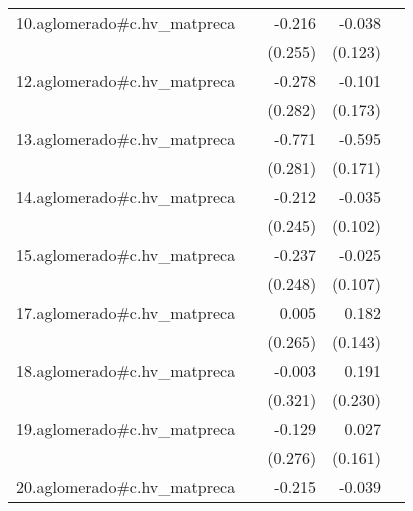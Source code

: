 {\begin{longtable}{l*{4}{D{.}{.}{-1}}}
\addlinespace
10.aglomerado#c.hv\_matpreca&                     &      -0.216         &      -0.038         &                     \\
            &                     &     (0.255)         &     (0.123)         &                     \\
\addlinespace
12.aglomerado#c.hv\_matpreca&                     &      -0.278         &      -0.101         &                     \\
            &                     &     (0.282)         &     (0.173)         &                     \\
\addlinespace
13.aglomerado#c.hv\_matpreca&                     &      -0.771\sym{**} &      -0.595\sym{***}&                     \\
            &                     &     (0.281)         &     (0.171)         &                     \\
\addlinespace
14.aglomerado#c.hv\_matpreca&                     &      -0.212         &      -0.035         &                     \\
            &                     &     (0.245)         &     (0.102)         &                     \\
\addlinespace
15.aglomerado#c.hv\_matpreca&                     &      -0.237         &      -0.025         &                     \\
            &                     &     (0.248)         &     (0.107)         &                     \\
\addlinespace
17.aglomerado#c.hv\_matpreca&                     &       0.005         &       0.182         &                     \\
            &                     &     (0.265)         &     (0.143)         &                     \\
\addlinespace
18.aglomerado#c.hv\_matpreca&                     &      -0.003         &       0.191         &                     \\
            &                     &     (0.321)         &     (0.230)         &                     \\
\addlinespace
19.aglomerado#c.hv\_matpreca&                     &      -0.129         &       0.027         &                     \\
            &                     &     (0.276)         &     (0.161)         &                     \\
\addlinespace
20.aglomerado#c.hv\_matpreca&                     &      -0.215         &      -0.039         &                     \\

\end{longtable}}
